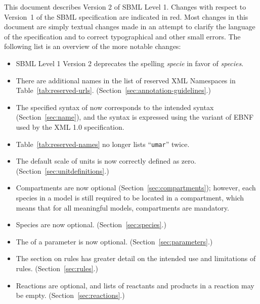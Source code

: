 \documentclass[10pt]{cekarticle}
\newcommand{\vref}[1]{\ref{#1}}
\newenvironment{blockChanged}{\color{BrickRed}}{}
\begin{document}
\begin{blockChanged}
  This document describes Version 2 of SBML Level 1.  Changes with respect
  to Version~1 of the SBML specification are indicated in red.  Most
  changes in this document are simply textual changes made in an attempt to
  clarify the language of the specification and to correct typographical
  and other small errors.  The following list is an overview of the more
  notable changes:
\vspace*{-1ex}\begin{itemize}\setlength{\parskip}{0.27ex}
  
\item SBML Level 1 Version 2 deprecates the spelling \emph{specie} 
  in favor of \emph{species}.
  
\item There are additional names in the list of reserved XML Namespaces in
  Table~\ref{tab:reserved-urls}. (Section~\ref{sec:annotation-guidelines}.)

\item The specified syntax of  now corresponds to the intended
  syntax (Section~\ref{sec:name}), and the syntax is expressed using the
  variant of EBNF used by the XML 1.0 specification.

\item Table~\vref{tab:reserved-names} no longer lists ``\texttt{umar}'' twice.

\item The default scale of units is now correctly defined as zero.
  (Section~\ref{sec:unitdefinitions}.)
  
\item Compartments are now optional (Section~\ref{sec:compartments});
  however, each species in a model is still required to be located in a
  compartment, which means that for all meaningful models, compartments are
  mandatory.

\item Species are now optional.  (Section~\ref{sec:species}.)

\item The  of a parameter is now optional.
  (Section~\ref{sec:parameters}.)
  
\item The section on rules has greater detail on the intended use and
  limitations of rules.  (Section~\ref{sec:rules}.)
  
\item Reactions are optional, and lists of reactants and products in a
  reaction may be empty.  (Section~\ref{sec:reactions}.)
  

\end{itemize}
\end{blockChanged}
\end{document}
